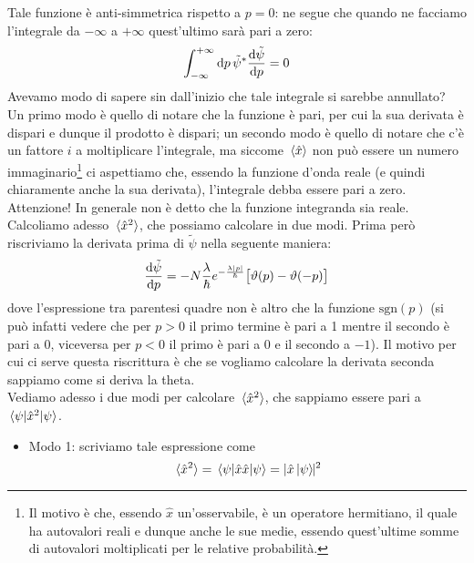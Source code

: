 \begin{soluzione}
   Tale funzione è anti-simmetrica rispetto a $p=0$: ne segue che quando ne facciamo l'integrale da $-\infty$ a $+\infty$ quest'ultimo sarà pari a zero:
   \begin{equation*}
      \int_{-\infty}^{+\infty} \dd{p} \tilde{\psi}^* \dv{\tilde{\psi}}{p}=0
   \end{equation*}
   Avevamo modo di sapere sin dall'inizio che tale integrale si sarebbe annullato?\\
   Un primo modo è quello di notare che la funzione è pari, per cui la sua derivata è dispari e dunque il prodotto è dispari; un secondo modo è quello di notare che c'è un fattore $i$ a moltiplicare l'integrale, ma siccome $\expval*{\hat{x}}$ non può essere un numero immaginario\footnote{Il motivo è che, essendo $\hat{x}$ un'osservabile, è un operatore hermitiano, il quale ha autovalori reali e dunque anche le sue medie, essendo quest'ultime somme di autovalori moltiplicati per le relative probabilità.} ci aspettiamo che, essendo la funzione d'onda reale (e quindi chiaramente anche la sua derivata), l'integrale debba essere pari a zero. Attenzione! In generale non è detto che la funzione integranda sia reale.\\
   Calcoliamo adesso $\expval*{\hat{x}^2}$, che possiamo calcolare in due modi. Prima però riscriviamo la derivata prima di $\tilde{\psi}$ nella seguente maniera:
   \begin{equation*}
      \dv{\tilde{\psi}}{p}=-N\frac{\lambda}{\hbar} e^{-\frac{\lambda|p|}{\hbar}} \big[ \vartheta(p) - \vartheta(-p) \big]
   \end{equation*}
   dove l'espressione tra parentesi quadre non è altro che la funzione $\text{sgn}(p)$ (si può infatti vedere che per $p>0$ il primo termine è pari a 1 mentre il secondo è pari a 0, viceversa per $p<0$ il primo è pari a 0 e il secondo a $-1$). Il motivo per cui ci serve questa riscrittura è che se vogliamo calcolare la derivata seconda sappiamo come si deriva la theta.\\
   Vediamo adesso i due modi per calcolare $\expval*{\hat{x}^2}$, che sappiamo essere pari a $\mel*{\psi}{\hat{x}^2}{\psi}$.
  \begin{itemize}[leftmargin=0.5cm]
   \item Modo 1: scriviamo tale espressione come
  \begin{equation*}
   \expval*{\hat{x}^2}
   =\mel*{\psi}{\hat{x}\hat{x}}{\psi}
   =| \hat{x}\ket*{\psi} \hspace{-0.1cm} |^2
  \end{equation*}

\end{itemize}
\end{soluzione}

